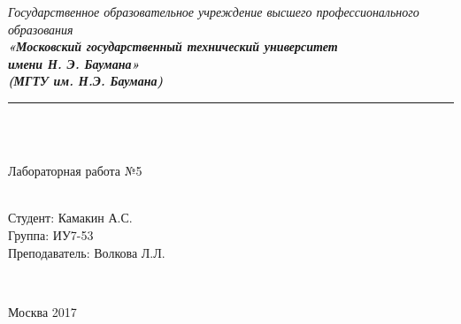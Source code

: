 \documentclass[utf8x, 12pt]{G7-32} %
\begin{document}
\frontmatter %



\begin{center}
	\hfill \break
	\textit{
		\normalsize{Государственное образовательное учреждение высшего профессионального образования}}\\ 
	
	\textit{
		\normalsize  {\bf  «Московский государственный технический университет}\\ 
		\normalsize  {\bf имени Н. Э. Баумана»}\\
		\normalsize  {\bf (МГТУ им. Н.Э. Баумана)}\\
	}
	\noindent\rule{\textwidth}{2pt}
	\hfill \break
	\noindent
	\\
	\noindent
	\\
	\hfill\break
	\hfill \break
	\hfill \break
	\hfill \break
	
	\hfill \break
	\large{Лабораторная работа №5\\ }\\
	\hfill \break
	\hfill \break
	\hfill \break
	\hfill \break
	\hfill \break	
	\normalsize {
		\begin{minipage}[t]{7cm}
		\end{minipage}
		\hfill
		\begin{minipage}[t]{7cm}
			\flushright
			Студент: Камакин А.С.\\
			Группа: ИУ7-53\\
			Преподаватель: Волкова Л.Л.
		\end{minipage}
	}\\
	\hfill \break	
	\hfill \break
	\hfill \break
	\hfill \break
	\hfill \break
\end{center}
\hfill \break
\hfill \break
\begin{center} Москва 2017 \end{center}

\thispagestyle{empty} %

\newpage

\mainmatter %
\end{document}

